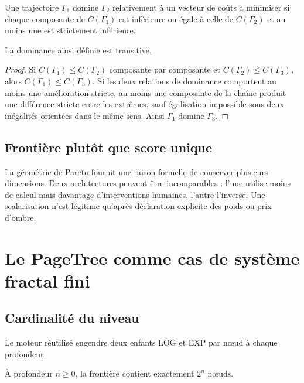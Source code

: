 \begin{definition}[Dominance]
Une trajectoire $\Gamma_1$ domine $\Gamma_2$ relativement à un vecteur de coûts à minimiser si chaque composante de $C(\Gamma_1)$ est inférieure ou égale à celle de $C(\Gamma_2)$ et au moins une est strictement inférieure.
\end{definition}

\begin{proposition}
La dominance ainsi définie est transitive.
\end{proposition}

\begin{proof}
Si $C(\Gamma_1)\leq C(\Gamma_2)$ composante par composante et $C(\Gamma_2)\leq C(\Gamma_3)$, alors $C(\Gamma_1)\leq C(\Gamma_3)$. Si les deux relations de dominance comportent au moins une amélioration stricte, au moins une composante de la chaîne produit une différence stricte entre les extrêmes, sauf égalisation impossible sous deux inégalités orientées dans le même sens. Ainsi $\Gamma_1$ domine $\Gamma_3$.
\end{proof}

\section{Frontière plutôt que score unique}

La géométrie de Pareto fournit une raison formelle de conserver plusieurs dimensions. Deux architectures peuvent être incomparables : l'une utilise moins de calcul mais davantage d'interventions humaines, l'autre l'inverse. Une scalarisation n'est légitime qu'après déclaration explicite des poids ou prix d'ombre.

\chapter{Le PageTree comme cas de système fractal fini}

\section{Cardinalité du niveau}

Le moteur réutilisé engendre deux enfants LOG et EXP par nœud à chaque profondeur.

\begin{proposition}
À profondeur $n\geq0$, la frontière contient exactement $2^n$ nœuds.
\end{proposition}

